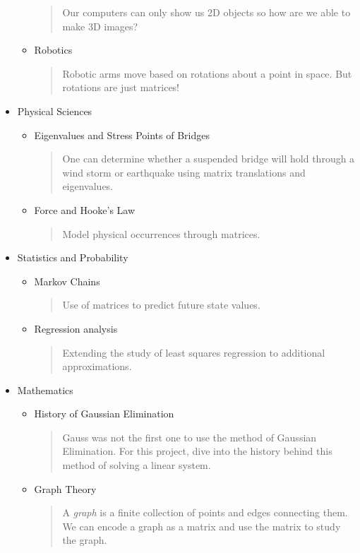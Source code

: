 \documentclass{article}
\begin{document}
\begin{itemize}
\begin{itemize}
\begin{quote}
					Our computers can only show us 2D objects so how are we able to make 3D images?
				\end{quote}
			\item Robotics
				\begin{quote}
					Robotic arms move based on rotations about a point in space.  But rotations are just matrices!
				\end{quote}
		\end{itemize}
	\item Physical Sciences
		\begin{itemize}
			\item Eigenvalues and Stress Points of Bridges	
				\begin{quote}
					One can determine whether a suspended bridge will hold through a wind storm or earthquake using matrix translations and eigenvalues.
				\end{quote}
			\item Force and Hooke's Law
				\begin{quote}
					Model physical occurrences through matrices.
				\end{quote}
		\end{itemize}
	\item Statistics and Probability
		\begin{itemize}
			\item Markov Chains
				\begin{quote}
					Use of matrices to predict future state values.
				\end{quote}
			\item Regression analysis
				\begin{quote}
					Extending the study of least squares regression to additional approximations.
				\end{quote}
		\end{itemize}
	\item Mathematics
		\begin{itemize} 
		\item History of Gaussian Elimination
			\begin{quote}
				Gauss was not the first one to use the method of Gaussian Elimination.  For this project, dive into the history behind this method of solving a linear system.
			\end{quote}
		\item Graph Theory
			\begin{quote}
				A \emph{graph} is a finite collection of points and edges connecting them. We can encode a graph as a matrix and use the matrix to study the graph.

\end{quote}
\end{itemize}
\end{itemize}
\end{document}
